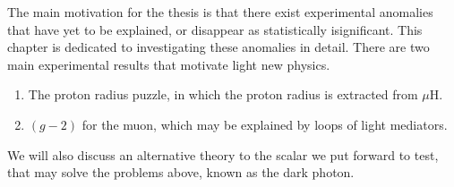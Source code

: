\label{chapter:review}

The main motivation for the thesis is that there exist experimental anomalies that have yet to be explained, or disappear as statistically isignificant.
This chapter is dedicated to investigating these anomalies in detail.
There are two main experimental results that motivate light new physics.

\begin{enumerate}
    \item The proton radius puzzle, in which the proton radius is extracted from $\mu\textrm{H}$.
    \item $(g-2)$ for the muon, which may be explained by loops of light mediators.
\end{enumerate}

We will also discuss an alternative theory to the scalar we put forward to test, that may solve the problems above, known as the dark photon.



